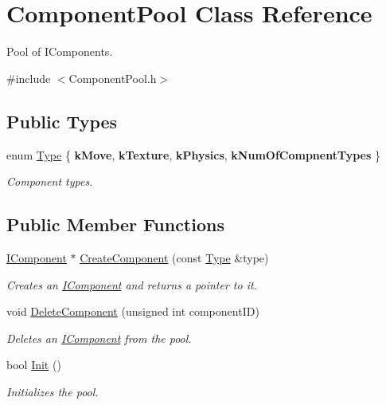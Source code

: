 \hypertarget{class_component_pool}{}\section{Component\+Pool Class Reference}
\label{class_component_pool}


Pool of I\+Components.  




{\ttfamily \#include $<$Component\+Pool.\+h$>$}

\subsection*{Public Types}
\begin{DoxyCompactItemize}
\item 
\mbox{\label{class_component_pool_a7a88ce8bc60d1936539c2b9757b7e9ff}} 
enum \mbox{\hyperlink{class_component_pool_a7a88ce8bc60d1936539c2b9757b7e9ff}{Type}} \{ {\bfseries k\+Move}, 
{\bfseries k\+Texture}, 
{\bfseries k\+Physics}, 
{\bfseries k\+Num\+Of\+Compnent\+Types}
 \}
\begin{DoxyCompactList}\small\item\em Component types. \end{DoxyCompactList}\end{DoxyCompactItemize}
\subsection*{Public Member Functions}
\begin{DoxyCompactItemize}
\item 
\mbox{\hyperlink{class_i_component}{I\+Component}} $\ast$ \mbox{\hyperlink{class_component_pool_a08fcae7465ae05cae03872bcaa30203d}{Create\+Component}} (const \mbox{\hyperlink{class_component_pool_a7a88ce8bc60d1936539c2b9757b7e9ff}{Type}} \&type)
\begin{DoxyCompactList}\small\item\em Creates an \mbox{\hyperlink{class_i_component}{I\+Component}} and returns a pointer to it. \end{DoxyCompactList}\item 
void \mbox{\hyperlink{class_component_pool_a5ffc15d4dabb968b528c349aea7b0357}{Delete\+Component}} (unsigned int component\+ID)
\begin{DoxyCompactList}\small\item\em Deletes an \mbox{\hyperlink{class_i_component}{I\+Component}} from the pool. \end{DoxyCompactList}\item 
\mbox{\label{class_component_pool_a2744a9ff52ecf322e5a76c4722d7f626}} 
bool \mbox{\hyperlink{class_component_pool_a2744a9ff52ecf322e5a76c4722d7f626}{Init}} ()
\begin{DoxyCompactList}\small\item\em Initializes the pool. \end{DoxyCompactList}\end{DoxyCompactItemize}


